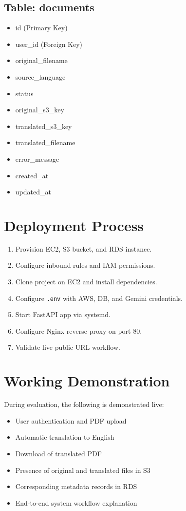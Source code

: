 \documentclass[12pt]{article}
\begin{document}
\subsection*{Table: documents}
\begin{itemize}[leftmargin=*]
    \item id (Primary Key)
    \item user\_id (Foreign Key)
    \item original\_filename
    \item source\_language
    \item status
    \item original\_s3\_key
    \item translated\_s3\_key
    \item translated\_filename
    \item error\_message
    \item created\_at
    \item updated\_at
\end{itemize}

\section{Deployment Process}
\begin{enumerate}[leftmargin=*]
    \item Provision EC2, S3 bucket, and RDS instance.
    \item Configure inbound rules and IAM permissions.
    \item Clone project on EC2 and install dependencies.
    \item Configure \texttt{.env} with AWS, DB, and Gemini credentials.
    \item Start FastAPI app via systemd.
    \item Configure Nginx reverse proxy on port 80.
    \item Validate live public URL workflow.
\end{enumerate}

\section{Working Demonstration}
During evaluation, the following is demonstrated live:
\begin{itemize}[leftmargin=*]
    \item User authentication and PDF upload
    \item Automatic translation to English
    \item Download of translated PDF
    \item Presence of original and translated files in S3
    \item Corresponding metadata records in RDS
    \item End-to-end system workflow explanation
\end{itemize}
\end{document}

